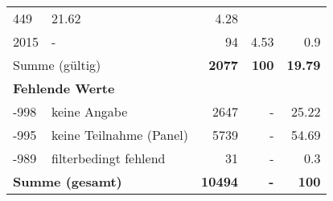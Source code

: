 \begin{longtable}{lXrrr}
       \num{449} &
       \num[round-mode=places,round-precision=2]{21.62} &
         \num[round-mode=places,round-precision=2]{4.28} \\

     2015 &
     \multicolumn{1}{X}{ -  } &


       \num{94} &
       \num[round-mode=places,round-precision=2]{4.53} &
         \num[round-mode=places,round-precision=2]{0.9} \\
     \midrule
     \multicolumn{2}{l}{Summe (gültig)} &
       \textbf{\num{2077}} &
     \textbf{\num{100}} &
       \textbf{\num[round-mode=places,round-precision=2]{19.79}} \\
     \multicolumn{5}{l}{\textbf{Fehlende Werte}}\\
       -998 &
       keine Angabe &
         \num{2647} &
        - &
         \num[round-mode=places,round-precision=2]{25.22} \\
       -995 &
       keine Teilnahme (Panel) &
         \num{5739} &
        - &
         \num[round-mode=places,round-precision=2]{54.69} \\
       -989 &
       filterbedingt fehlend &
         \num{31} &
        - &
         \num[round-mode=places,round-precision=2]{0.3} \\
     \midrule
     \multicolumn{2}{l}{\textbf{Summe (gesamt)}} &
          \textbf{\num{10494}} &
        \textbf{-} &
        \textbf{\num{100}} \\
     \bottomrule
     \end{longtable}
     
